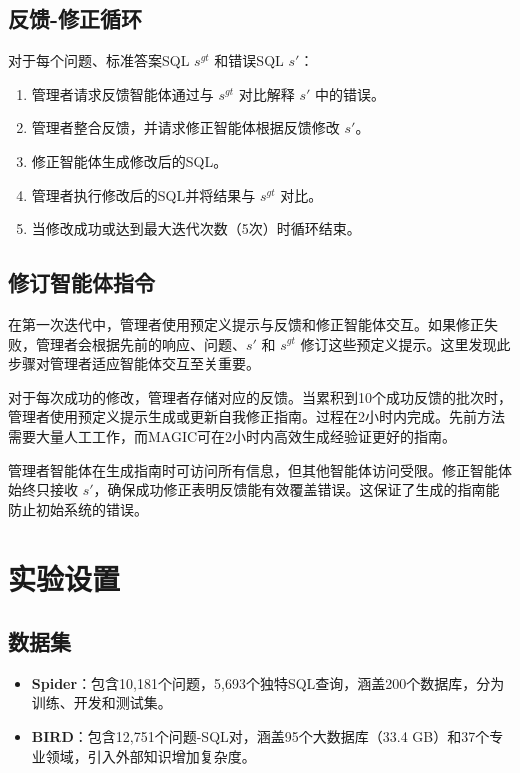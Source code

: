 \subsection{反馈-修正循环}
对于每个问题、标准答案SQL \(s^{gt}\) 和错误SQL \(s'\)：
\begin{enumerate}
    \item 管理者请求反馈智能体通过与 \(s^{gt}\) 对比解释 \(s'\) 中的错误。
    \item 管理者整合反馈，并请求修正智能体根据反馈修改 \(s'\)。
    \item 修正智能体生成修改后的SQL。
    \item 管理者执行修改后的SQL并将结果与 \(s^{gt}\) 对比。
    \item 当修改成功或达到最大迭代次数（5次）时循环结束。
\end{enumerate}

\subsection{修订智能体指令}
在第一次迭代中，管理者使用预定义提示与反馈和修正智能体交互。如果修正失败，管理者会根据先前的响应、问题、\(s'\) 和 \(s^{gt}\) 修订这些预定义提示。这里发现此步骤对管理者适应智能体交互至关重要。

对于每次成功的修改，管理者存储对应的反馈。当累积到10个成功反馈的批次时，管理者使用预定义提示生成或更新自我修正指南。过程在2小时内完成。先前方法需要大量人工工作，而MAGIC可在2小时内高效生成经验证更好的指南。

管理者智能体在生成指南时可访问所有信息，但其他智能体访问受限。修正智能体始终只接收 \(s'\)，确保成功修正表明反馈能有效覆盖错误。这保证了生成的指南能防止初始系统的错误。

\section{实验设置}

\subsection{数据集}
\begin{itemize}
    \item \textbf{Spider}：包含10,181个问题，5,693个独特SQL查询，涵盖200个数据库，分为训练、开发和测试集。
    \item \textbf{BIRD}：包含12,751个问题-SQL对，涵盖95个大数据库（33.4 GB）和37个专业领域，引入外部知识增加复杂度。
\end{itemize}

